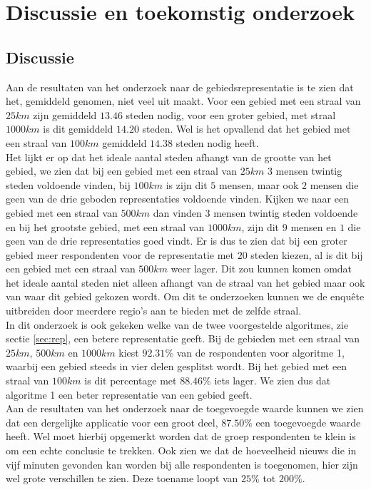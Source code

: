 \documentclass[twoside,openright]{uva-bachelor-thesis}
\begin{document}
\chapter{Discussie en toekomstig onderzoek}
	\section{Discussie}
	Aan de resultaten van het onderzoek naar de gebiedsrepresentatie is te zien dat het, gemiddeld genomen, niet veel uit maakt. Voor een gebied met een straal van $25km$ zijn gemiddeld $13.46$ steden nodig, voor een groter gebied, met straal $1000km$ is dit gemiddeld $14.20$ steden. Wel is het opvallend dat het gebied met een straal van $100km$ gemiddeld $14.38$ steden nodig heeft. \\[0.5cm]
	Het lijkt er op dat het ideale aantal steden afhangt van de grootte van het gebied, we zien dat bij een gebied met een straal van $25km$ $3$ mensen twintig steden voldoende vinden, bij $100km$ is zijn dit $5$ mensen, maar ook $2$ mensen die geen van de drie geboden representaties voldoende vinden. Kijken we naar een gebied met een straal van $500km$ dan vinden $3$ mensen twintig steden voldoende en bij het grootste gebied, met een straal van $1000km$, zijn dit $9$ mensen en $1$ die geen van de drie representaties goed vindt. Er is dus te zien dat bij een groter gebied meer respondenten voor de representatie met $20$ steden kiezen, al is dit bij een gebied met een straal van $500km$ weer lager. Dit zou kunnen komen omdat het ideale aantal steden niet alleen afhangt van de straal van het gebied maar ook van waar dit gebied gekozen wordt. Om dit te onderzoeken kunnen we de enqu\^ete uitbreiden door meerdere regio's aan te bieden met de zelfde straal.\\[0.5cm]
	In dit onderzoek is ook gekeken welke van de twee voorgestelde algoritmes, zie sectie \ref{sec:rep}, een betere representatie geeft. Bij de gebieden met een straal van $25km$, $500km$ en $1000km$ kiest $92.31\%$ van de respondenten voor algoritme 1, waarbij een gebied steeds in vier delen gesplitst wordt. Bij het gebied met een straal van $100km$ is dit percentage met $88.46\%$ iets lager. We zien dus dat algoritme 1 een beter representatie van een gebied geeft.\\[0.5cm]
	Aan de resultaten van het onderzoek naar de toegevoegde waarde kunnen we zien dat een dergelijke applicatie voor een groot deel, $87.50\%$ een toegevoegde waarde heeft. Wel moet hierbij opgemerkt worden dat de groep respondenten te klein is om een echte conclusie te trekken. Ook zien we dat de hoeveelheid nieuws die in vijf minuten gevonden kan worden bij alle respondenten is toegenomen, hier zijn wel grote verschillen te zien. Deze toename loopt van $25\%$ tot $200\%$. \\[0.5cm]
\end{document}
